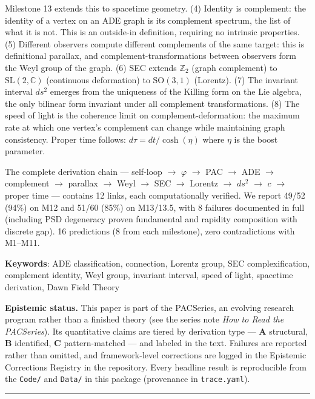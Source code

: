 \documentclass[11pt,a4paper]{article}
\begin{document}
Milestone 13 extends this to spacetime geometry. (4) Identity is complement: the identity of a vertex on an ADE graph is its complement spectrum, the list of what it is not. This is an outside-in definition, requiring no intrinsic properties. (5) Different observers compute different complements of the same target: this is definitional parallax, and complement-transformations between observers form the Weyl group of the graph. (6) SEC extends $\mathbb{Z}_2$ (graph complement) to $\text{SL}(2,\mathbb{C})$ (continuous deformation) to $\text{SO}(3,1)$ (Lorentz). (7) The invariant interval $ds^2$ emerges from the uniqueness of the Killing form on the Lie algebra, the only bilinear form invariant under all complement transformations. (8) The speed of light is the coherence limit on complement-deformation: the maximum rate at which one vertex's complement can change while maintaining graph consistency. Proper time follows: $d\tau = dt / \cosh(\eta)$ where $\eta$ is the boost parameter.

The complete derivation chain — self-loop $\to$ $\varphi$ $\to$ PAC $\to$ ADE $\to$ complement $\to$ parallax $\to$ Weyl $\to$ SEC $\to$ Lorentz $\to$ $ds^2$ $\to$ $c$ $\to$ proper time — contains 12 links, each computationally verified. We report 49/52 (94\%) on M12 and 51/60 (85\%) on M13/13.5, with 8 failures documented in full (including PSD degeneracy proven fundamental and rapidity composition with discrete gap). 16 predictions (8 from each milestone), zero contradictions with M1–M11.

\textbf{Keywords}: ADE classification, connection, Lorentz group, SEC complexification, complement identity, Weyl group, invariant interval, speed of light, spacetime derivation, Dawn Field Theory

\textbf{Epistemic status.} This paper is part of the PACSeries, an evolving research program rather than a finished theory (see the series note \emph{How to Read the PACSeries}). Its quantitative claims are tiered by derivation type — \textbf{A} structural, \textbf{B} identified, \textbf{C} pattern-matched — and labeled in the text. Failures are reported rather than omitted, and framework-level corrections are logged in the Epistemic Corrections Registry in the repository. Every headline result is reproducible from the \texttt{Code/} and \texttt{Data/} in this package (provenance in \texttt{trace.yaml}).

\begin{center}\rule{0.5\linewidth}{0.4pt}\end{center}
\end{document}
